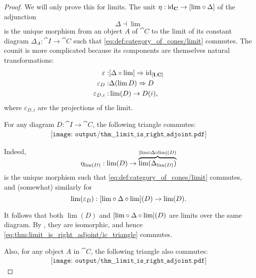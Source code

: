 \begin{proof}
  We will only prove this for limits. The unit \( \eta: \id_{\cat{C}} \to [{\lim} \bincirc \Delta] \) of the adjunction
  \begin{equation*}
    \Delta \dashv \lim
  \end{equation*}
  is the unique morphism from an object \( A \) of \( \cat{C} \) to the limit of its constant diagram \( \Delta_A: \cat{I} \to \cat{C} \) such that \eqref{eq:def:category_of_cones/limit} commutes. The counit is more complicated because its components are themselves natural transformations:
  \begin{equation*}
    \begin{aligned}
      \varepsilon:       &[\Delta \bincirc \lim] \Rightarrow \id_{[\cat{I}, \cat{C}]} \\
      \varepsilon_D:     &\Delta(\lim D) \Rightarrow D \\
      \varepsilon_{D,i}: &\lim(D) \to D(i),
    \end{aligned}
  \end{equation*}
  where \( \varepsilon_{D,i} \) are the projections of the limit.

  For any diagram \( D: \cat{I} \to \cat{C} \), the following triangle commutes:
  \begin{equation}\label{eq:thm:limit_is_right_adjoint/ic_triangle}
    \begin{aligned}
      \texttt{[image: output/thm\_\_limit\_is\_right\_adjoint.pdf]}
    \end{aligned}
  \end{equation}

  Indeed,
  \begin{equation*}
    \eta_{\lim(D)}: \lim(D) \to \smash{ \overbrace{\lim(\Delta_{\lim(D)})}^{[{\lim} \bincirc \Delta \bincirc {\lim}](D)} }
  \end{equation*}
  is the unique morphism such that \eqref{eq:def:category_of_cones/limit} commutes, and (somewhat) similarly for
  \begin{equation*}
    \lim(\varepsilon_D): [{\lim} \bincirc \Delta \bincirc {\lim}](D) \to \lim(D).
  \end{equation*}

  It follows that both \( \lim(D) \) and \( [{\lim} \bincirc \Delta \bincirc {\lim}](D) \) are limits over the same diagram. By , they are isomorphic, and hence \eqref{eq:thm:limit_is_right_adjoint/ic_triangle} commutes.

  Also, for any object \( A \) in \( \cat{C} \), the following triangle also commutes:
  \begin{equation}\label{eq:thm:limit_is_right_adjoint/c_triangle}
    \begin{aligned}
      \texttt{[image: output/thm\_\_limit\_is\_right\_adjoint.pdf]}
    \end{aligned}
  \end{equation}


\end{proof}
